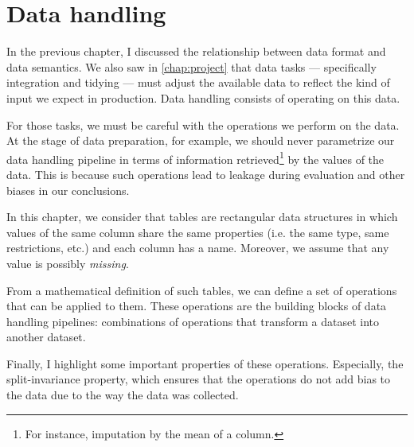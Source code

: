 \chapter{Data handling}
\label{chap:handling}
\glsresetall


In the previous chapter, I discussed the relationship between data format and data
semantics.  We also saw in \cref{chap:project} that data tasks --- specifically
integration and tidying --- must adjust the available data to reflect the kind of
input we expect in production.  Data handling consists of operating on this data.

For those tasks, we must be careful with the operations we perform on the data. At the
stage of data preparation, for example, we should never parametrize our data handling
pipeline in terms of information retrieved\footnote{For instance, imputation by the mean
of a column.} by the values of the data.  This is because such operations lead to \gls{leakage}
during evaluation and other biases in our conclusions.

In this chapter, we consider that tables are rectangular data structures in which values
of the same column share the same properties (i.e. the same type, same restrictions, etc.)
and each column has a name.  Moreover, we assume that any value is possibly
\emph{missing}.

From a mathematical definition of such tables, we can define a set of operations that can
be applied to them.  These operations are the building blocks of data handling pipelines:
combinations of operations that transform a dataset into another dataset.

Finally, I highlight some important properties of these operations.  Especially, the
split-invariance property, which ensures that the operations do not add bias to the data
due to the way the data was collected.

